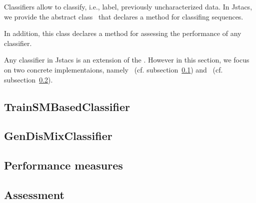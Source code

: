 Classifiers allow to classify, i.e., label, previously uncharacterized data. In Jstacs, we provide the abstract class \AbstractClassifier~that declares a method for classifing sequences.

\setcounter{off}{542}

In addition, this class declares a method for assessing the performance of any classifier.


Any classifier in Jstacs is an extension of the \AbstractClassifier. However in this section, we focus on two concrete implementaions, namely \TrainSMBasedClassifier~(cf. subsection~\ref{TrainSMBasedClassifier}) and \GenDisMixClassifier~(cf. subsection~\ref{GenDisMixClassifier}). 

\subsection{TrainSMBasedClassifier}\label{TrainSMBasedClassifier}
\subsection{GenDisMixClassifier}\label{GenDisMixClassifier}
\subsection{Performance measures}
\subsection{Assessment}